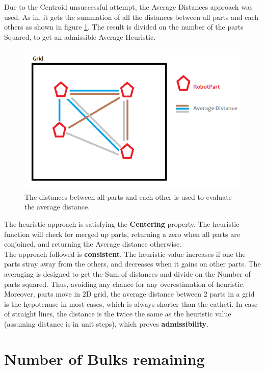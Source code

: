 Due to the Centroid unsuccessful attempt, the Average Distances approach was used. As in, it gets the summation of all the distances between all parts and each others as shown in figure \ref{fig:averagedistance}. The result is divided on the number of the parts Squared, to get an admissible Average Heuristic.

\begin{figure}[H] 
   	\centering
	\includegraphics[scale=0.6]{images/averagedistance} 
    \caption{The distances between all parts and each other is used to evaluate the average distance. }
    \label{fig:averagedistance} 
\end{figure}

The heuristic approach is satisfying the \textbf{Centering} property. The heuristic function will check for merged up parts, returning a zero when all parts are conjoined, and returning the Average distance otherwise. \\

The approach followed is \textbf{consistent}. The heuristic value increases if one the parts stray away from the others, and decreases when it gains on other parts. The averaging is designed to get the Sum of distances and divide on the Number of parts squared. Thus, avoiding any chance for any overestimation of heuristic. Moreover, parts move in 2D grid, the average distance between 2 parts in a grid is the hypotenuse in most cases, which is always shorter than the catheti. In case of straight lines, the distance is the twice the same as the heuristic value (assuming distance is in unit steps), which proves \textbf{admissibility}.	


\section{Number of Bulks remaining}

